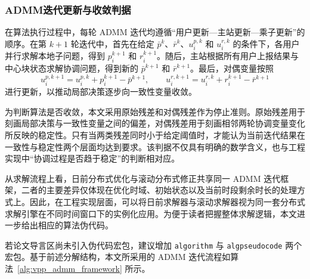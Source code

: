 \subsubsection{ADMM迭代更新与收敛判据}
\label{subsubsec:vpp_admm_model_algorithm_update}

在算法执行过程中，每轮 ADMM 迭代均遵循“用户更新—主站更新—乘子更新”的顺序。在第 $k+1$ 轮迭代中，首先在给定 $\bar p^{k}$、$\bar r^{k}$、$u_i^{p,k}$ 和 $u_i^{r,k}$ 的条件下，各用户并行求解本地子问题，得到 $p_i^{k+1}$ 和 $r_i^{k+1}$。随后，主站根据所有用户上报结果与中心块状态求解协调问题，得到新的 $\bar p^{k+1}$ 和 $\bar r^{k+1}$。最后，对偶变量按照
\begin{equation}
u_i^{p,k+1} = u_i^{p,k} + p_i^{k+1} - \bar p^{k+1},
\qquad
u_i^{r,k+1} = u_i^{r,k} + r_i^{k+1} - \bar r^{k+1}
\end{equation}
进行更新，以推动局部决策逐步向一致性变量收敛。

为判断算法是否收敛，本文采用原始残差和对偶残差作为停止准则。原始残差用于刻画局部决策与一致性变量之间的偏差，对偶残差用于刻画相邻两轮协调变量变化所反映的稳定性。只有当两类残差同时小于给定阈值时，才能认为当前迭代结果在一致性与稳定性两个层面均达到要求。该判据不仅具有明确的数学含义，也与工程实现中“协调过程是否趋于稳定”的判断相对应。

从求解流程上看，日前分布式优化与滚动分布式修正共享同一 ADMM 迭代框架，二者的主要差异仅体现在优化时域、初始状态以及当前时段剩余时长的处理方式上。因此，在工程实现层面，可以将日前求解器与滚动求解器视为同一套分布式求解引擎在不同时间窗口下的实例化应用。为便于读者把握整体求解逻辑，本文进一步给出相应的算法伪代码。

若论文导言区尚未引入伪代码宏包，建议增加 \verb|algorithm| 与 \verb|algpseudocode| 两个宏包。基于前述分解结构，本文所采用的 ADMM 迭代流程如算法~\ref{alg:vpp_admm_framework} 所示。

